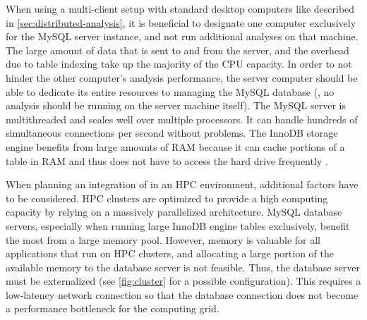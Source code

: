\label{sec:distributed-analysis-discussion}
When using a multi-client setup with standard desktop computers like described
in \autoref{sec:distributed-analysis}, it is beneficial to designate one
computer exclusively for the MySQL server instance, and not run additional
\pname analyses on that machine. The large amount of data that is sent to and
from the server, and the overhead due to table indexing take up the majority of
the CPU capacity. In order to not hinder the other computer's analysis
performance, the server computer should be able to dedicate its entire resources
to managing the MySQL database (\ie, no \pname analysis should be running on the
server machine itself). The MySQL server is multithreaded and scales well over
multiple processors. It can handle hundreds of simultaneous connections per
second without problems. The InnoDB storage engine benefits from large amounts
of RAM because it can cache portions of a table in RAM and thus does not have to
access the hard drive frequently \citep{schneider2005}.

When planning an integration of \pname in an HPC environment, additional factors
have to be considered. HPC clusters are optimized to provide a high computing
capacity by relying on a massively parallelized architecture. MySQL database
servers, especially when running large InnoDB engine tables exclusively, benefit
the most from a large memory pool. However, memory is valuable for all
applications that run on HPC clusters, and allocating a large portion of the
available memory to the database server is not feasible. Thus, the database
server must be externalized (see \autoref{fig:cluster} for a possible
configuration). This requires a low-latency network connection so that the
database connection does not become a performance bottleneck for the computing
grid.


